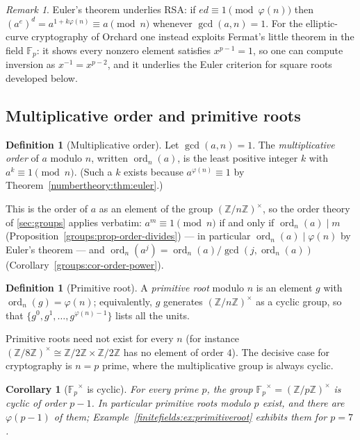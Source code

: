 \documentclass[11pt,a4paper]{article}
\newtheorem{corollary}[theorem]{Corollary}
\theoremstyle{definition}
\newtheorem{definition}[theorem]{Definition}
\theoremstyle{remark}
\newtheorem{remark}[theorem]{Remark}
\newcommand{\Z}{\ensuremath{\mathbb{Z}}}
\newcommand{\Fp}{\ensuremath{\mathbb{F}_{p}}}
\DeclareMathOperator{\ord}{ord}
\begin{document}
\begin{remark}\label{numbertheory:rem:fermat-rsa}
Euler's theorem underlies RSA: if \(ed \equiv 1 \pmod{\varphi(n)}\) then \((a^e)^d = a^{1+k\varphi(n)} \equiv a \pmod n\) whenever \(\gcd(a,n)=1\). For the elliptic-curve cryptography of Orchard one instead exploits Fermat's little theorem in the field \(\Fp\): it shows every nonzero element satisfies \(x^{p-1}=1\), so one can compute inversion as \(x^{-1} = x^{p-2}\), and it underlies the Euler criterion for square roots developed below.
\end{remark}

\subsection{Multiplicative order and primitive roots}\label{numbertheory:subsec:order}

\begin{definition}[Multiplicative order]\label{numbertheory:def:ord}
Let \(\gcd(a,n)=1\). The \emph{multiplicative order} of \(a\) modulo \(n\), written \(\ord_n(a)\), is the least positive integer \(k\) with \(a^k \equiv 1 \pmod n\). (Such a \(k\) exists because \(a^{\varphi(n)}\equiv 1\) by Theorem~\ref{numbertheory:thm:euler}.)
\end{definition}

This is the order of \(a\) as an element of the group \((\Z/n\Z)^\times\), so the order theory of \cref{sec:groups} applies verbatim: \(a^m \equiv 1 \pmod n\) if and only if \(\ord_n(a) \mid m\) (Proposition~\ref{groups:prop-order-divides}) --- in particular \(\ord_n(a) \mid \varphi(n)\) by Euler's theorem --- and \(\ord_n(a^j) = \ord_n(a)/\gcd(j, \ord_n(a))\) (Corollary~\ref{groups:cor-order-power}).

\begin{definition}[Primitive root]\label{numbertheory:def:primitive-root}
A \emph{primitive root} modulo \(n\) is an element \(g\) with \(\ord_n(g) = \varphi(n)\); equivalently, \(g\) generates \((\Z/n\Z)^\times\) as a cyclic group, so that \(\{g^0, g^1, \dots, g^{\varphi(n)-1}\}\) lists all the units.
\end{definition}

Primitive roots need not exist for every \(n\) (for instance \((\Z/8\Z)^\times \cong \Z/2\Z \times \Z/2\Z\) has no element of order \(4\)). The decisive case for cryptography is \(n=p\) prime, where the multiplicative group is always cyclic.

\begin{corollary}[\(\Fp^\times\) is cyclic]\label{numbertheory:thm:fp-cyclic}
For every prime \(p\), the group \(\Fp^\times = (\Z/p\Z)^\times\) is cyclic of order \(p-1\). In particular primitive roots modulo \(p\) exist, and there are \(\varphi(p-1)\) of them; Example~\ref{finitefields:ex:primitiveroot} exhibits them for \(p = 7\).
\end{corollary}
\end{document}
